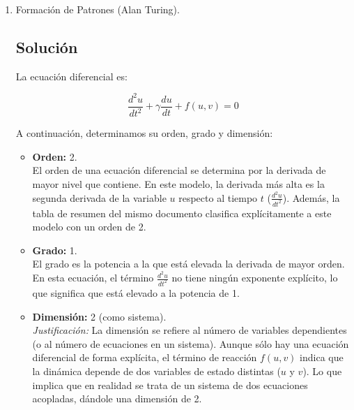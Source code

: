 \begin{enumerate}[label=\arabic*., leftmargin=*]
\begin{itemize}[leftmargin=*]
        \item \textbf{Dimensión:} 1.\\
        Se trata de una Ecuación Diferencial Ordinaria (EDO) escalar, lo que significa que el sistema consta de una única ecuación con una sola variable independiente ($x$) y una variable dependiente ($y$).
    \end{itemize}
    
    \item Formación de Patrones (Alan Turing).
    \subsection{Solución}

    La ecuación diferencial es:

    \[ \frac{d^2u}{dt^2} + \gamma \frac{du}{dt} + f(u, v) = 0 \]

    A continuación, determinamos su orden, grado y dimensión:

    \begin{itemize}[leftmargin=*]
        \item \textbf{Orden:} 2.\\
        El orden de una ecuación diferencial se determina por la derivada de mayor nivel que contiene. En este modelo, la derivada más alta es la segunda derivada de la variable $u$ respecto al tiempo $t$ ($\frac{d^2u}{dt^2}$). Además, la tabla de resumen del mismo documento clasifica explícitamente a este modelo con un orden de 2.

        \item \textbf{Grado:} 1.\\
        El grado es la potencia a la que está elevada la derivada de mayor orden. En esta ecuación, el término $\frac{d^2u}{dt^2}$ no tiene ningún exponente explícito, lo que significa que está elevado a la potencia de 1.

        \item \textbf{Dimensión:} 2 (como sistema).\\
        \textit{Justificación:} La dimensión se refiere al número de variables dependientes (o al número de ecuaciones en un sistema). Aunque sólo hay una ecuación diferencial de forma explícita, el término de reacción $f(u, v)$ indica que la dinámica depende de dos variables de estado distintas ($u$ y $v$). Lo que implica que en realidad se trata de un sistema de dos ecuaciones acopladas, dándole una dimensión de 2.
    \end{itemize}


\end{enumerate}
